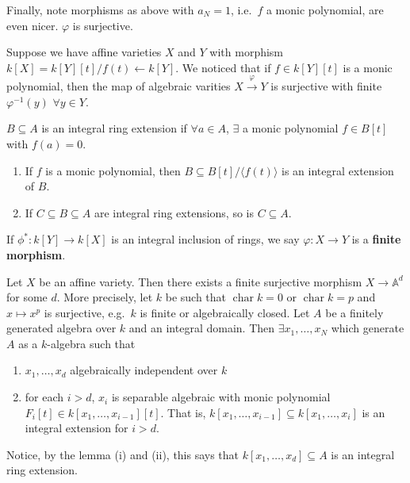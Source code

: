 \documentclass{article}
\newcommand{\A}{\mathbb{A}}
\DeclareMathOperator{\chara}{char}
\begin{document}
Finally, note morphisms as above with $a_N = 1$, i.e.\ $f$ a monic polynomial, are even nicer. $\varphi$ is surjective.

Suppose we have affine varieties $X$ and $Y$ with morphism $k[X] = k[Y][t]/f(t) \leftarrow k[Y]$.
We noticed that if $f \in k[Y][t]$ is a monic polynomial, then the map of algebraic varities $X \xrightarrow{\varphi} Y$ is surjective with finite $\varphi^{-1}(y)$ $\forall y \in Y$.

\begin{defi}
    $B \subseteq A$ is an integral ring extension if $\forall a \in A$, $\exists$ a monic polynomial $f \in B[t]$ with $f(a) = 0$.
\end{defi}
\begin{lemma}
    \begin{enumerate}[label=(\roman*)]
        \item If $f$ is a monic polynomial, then $B \subseteq B[t]/\langle f(t) \rangle$ is an integral extension of $B$.
        \item If $C \subseteq B \subseteq A$ are integral ring extensions, so is $C \subseteq A$.
    \end{enumerate}
\end{lemma}
\begin{defi}
    If $\phi^*: k[Y] \to k[X]$ is an integral inclusion of rings, we say $\varphi: X \to Y$ is a \textbf{finite morphism}.
\end{defi}
\begin{thm}
    Let $X$ be an affine variety. Then there exists a finite surjective morphism $X \to \A^d$ for some $d$.
    More precisely, let $k$ be such that $\chara k = 0$ or $\chara k = p$ and $x \mapsto x^p$ is surjective, e.g.\ $k$ is finite or algebraically closed.
    Let $A$ be a finitely generated algebra over $k$ and an integral domain. Then $\exists x_1, \dotsc, x_N$ which generate $A$ as a $k$-algebra such that
    \begin{enumerate}[label=(\roman*)]
        \item $x_1, \dotsc, x_d$ algebraically independent over $k$
        \item for each $i > d$, $x_i$ is separable algebraic with monic polynomial $F_i[t] \in k[x_1, \dotsc, x_{i-1}][t]$. That is, $k[x_1, \dotsc, x_{i-1}] \subseteq k[x_1, \dotsc, x_i]$ is an integral extension for $i > d$.
    \end{enumerate}
\end{thm}
Notice, by the lemma (i) and (ii), this says that $k[x_1, \dotsc, x_d] \subseteq A$ is an integral ring extension.
\end{document}
